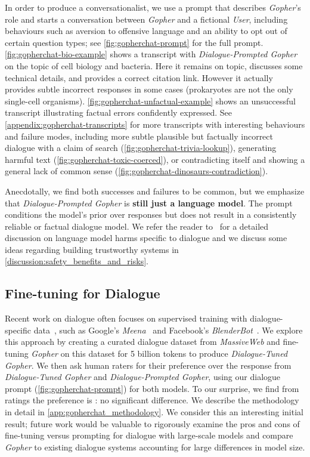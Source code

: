 \documentclass[11pt, a4paper, logo, internal, copyright, nonumbering]{deepmind}
\newcommand{\massiveweb}{\textit{MassiveWeb}\xspace}
\newcommand{\gopher}{\textit{Gopher}\xspace}
\newcommand{\gopherchat}{\textit{Dialogue-Prompted Gopher}\xspace}
\newcommand{\gopherchatsl}{\textit{Dialogue-Tuned Gopher}\xspace}
\newcommand{\user}{\textit{User}\xspace}
\begin{document}
In order to produce a conversationalist, we use a prompt that describes \gopher's role and starts a conversation between \gopher and a fictional \user, including behaviours such as aversion to offensive language and an ability to opt out of certain question types; see \autoref{fig:gopherchat-prompt} for the full prompt. \autoref{fig:gopherchat-bio-example} shows a transcript with \gopherchat on the topic of cell biology and bacteria. Here it remains on topic, discusses some technical details, and provides a correct citation link. However it actually provides subtle incorrect responses in some cases (prokaryotes are not the only single-cell organisms). \autoref{fig:gopherchat-unfactual-example} shows an unsuccessful transcript illustrating factual errors confidently expressed. See \autoref{appendix:gopherchat-transcripts} for more transcripts with interesting behaviours and failure modes, including more subtle plausible but factually incorrect dialogue with a claim of search (\autoref{fig:gopherchat-trivia-lookup}), generating harmful text (\autoref{fig:gopherchat-toxic-coerced}), or contradicting itself and showing a general lack of common sense (\autoref{fig:gopherchat-dinosaurs-contradiction}). 

Anecdotally, we find both successes and failures to be common, but we emphasize that \gopherchat is \textbf{still just a language model}. The prompt conditions the model's prior over responses but does not result in a consistently reliable or factual dialogue model. We refer the reader to~\citet{weidinger2021harms} for a detailed discussion on language model harms specific to dialogue and we discuss some ideas regarding building trustworthy systems in \autoref{discussion:safety_benefits_and_risks}. 

\subsection{ Fine-tuning for Dialogue }

Recent work on dialogue often focuses on supervised training with dialogue-specific data~\citep{chen2017survey}, such as Google's \textit{Meena}~\citep{adiwardana2020towards} and Facebook's \textit{BlenderBot}~\citep{roller2020recipes}. We explore this approach by creating a curated dialogue dataset from \massiveweb and fine-tuning \gopher on this dataset for 5 billion tokens to produce \gopherchatsl. We then ask human raters for their preference over the response from \gopherchatsl and \gopherchat, using our dialogue prompt (\autoref{fig:gopherchat-prompt}) for both models. To our surprise, we find from  ratings the preference is  : no significant difference. We describe the methodology in detail in \autoref{app:gopherchat_methodology}. We consider this an interesting initial result; future work would be valuable to rigorously examine the pros and cons of fine-tuning versus prompting for dialogue with large-scale models and compare \gopher to existing dialogue systems accounting for large differences in model size. 
\end{document}
